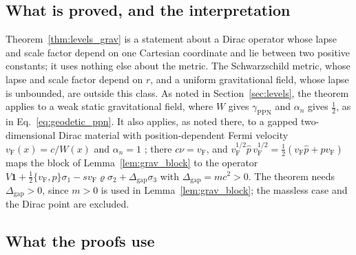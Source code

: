 \documentclass[aps,prd,onecolumn,tightenlines,nofootinbib,notitlepage,11pt,floatfix]{revtex4-2}
\theoremstyle{indentedtheorem}
\begin{document}
\subsection{What is proved, and the interpretation}
\label{sup:what_proved}

Theorem~\ref{thm:levels_grav} is a statement about a Dirac operator whose lapse and scale factor depend on one Cartesian coordinate and lie between two positive constants; it uses nothing else about the metric. The Schwarzschild metric, whose lapse and scale factor depend on $r$, and a uniform gravitational field, whose lapse is unbounded, are outside this class. As noted in Section~\ref{sec:levels}, the theorem applies to a weak static gravitational field, where $W$ gives $\gamma_\text{PPN}$ and $\alpha_n$ gives $\tfrac{1}{2}$, as in Eq.~\eqref{eq:geodetic_ppn}. It also applies, as noted there, to a gapped two-dimensional Dirac material with position-dependent Fermi velocity $v_\text{F}(x)=c/W(x)$ and $\alpha_n=1$ \citep{deJuanSturlaVozmediano2012Space}; there $c\nu=v_\text{F}$, and $v_\text{F}^{1/2}\hat{p}\,v_\text{F}^{1/2}=\tfrac{1}{2}(v_\text{F}\hat{p}+\hat{p}v_\text{F})$ maps the block of Lemma~\ref{lem:grav_block} to the operator $V\mathbf{1}+\tfrac{1}{2}\{v_\text{F},\hat{p}\}\sigma_1-sv_\text{F}\varrho\sigma_2+\Delta_\text{gap}\sigma_3$ with $\Delta_\text{gap}=mc^2>0$. The theorem needs $\Delta_\text{gap}>0$, since $m>0$ is used in Lemma~\ref{lem:grav_block}; the massless case and the Dirac point are excluded.

\subsection{What the proofs use}
\label{sup:proofs_use}
\end{document}
